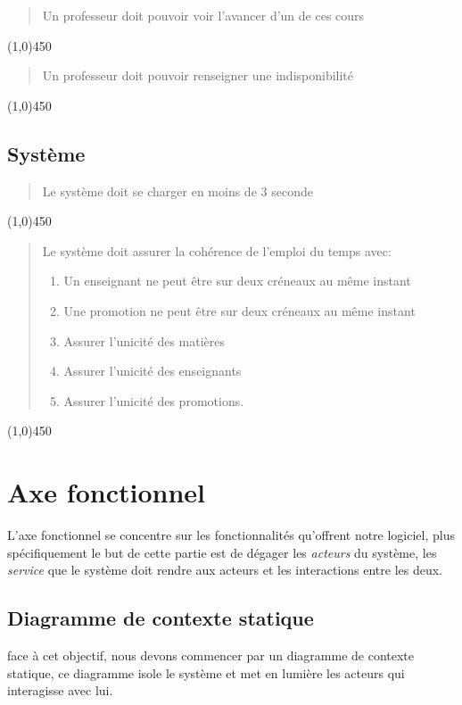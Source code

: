 \documentclass[a4paper,french,final]{memoir}
\begin{document}
\begin{quote}
    Un professeur doit pouvoir voir l'avancer d'un de ces cours
\end{quote}
\line(1,0){450}

\begin{quote}
    Un professeur doit pouvoir renseigner une indisponibilité
\end{quote}
\line(1,0){450}


\section{Système}
\begin{quote}
    Le système doit se charger en moins de 3 seconde
\end{quote}
\line(1,0){450}

\begin{quote}
    Le système doit assurer la cohérence de l'emploi du temps avec:
    \begin{enumerate}
        \item Un enseignant ne peut être sur deux créneaux au même instant
        \item Une promotion ne peut être sur deux créneaux au même instant
        \item Assurer l'unicité des matières
        \item Assurer l'unicité des enseignants
        \item Assurer l'unicité des promotions.
    \end{enumerate}
\end{quote}
\line(1,0){450}


\chapter{Axe fonctionnel}



\renewcommand\numberlinebox[2]{#2} %
\renewcommand\chapternumberlinebox[2]{#2} %

L'axe fonctionnel se concentre sur les fonctionnalités qu'offrent notre logiciel, plus spécifiquement le but de cette partie est de dégager les \emph{acteurs} du système, les \emph{service} que le système doit rendre aux acteurs et les interactions entre les deux.

\section{Diagramme de contexte statique}
face à cet objectif, nous devons commencer par un diagramme de contexte statique, ce diagramme isole le système et met en lumière les acteurs
qui interagisse avec lui.
\begin{center}
    
\end{center}
\end{document}
